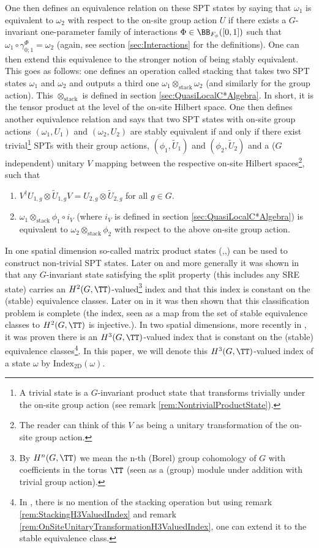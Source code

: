 One then defines an equivalence relation on these SPT states by saying that $\omega_1$ is equivalent to $\omega_2$ with respect to the on-site group action $U$ if there exists a $G$-invariant one-parameter family of interactions $\Phi\in\BB_{F_\phi}([0,1])$ such that $\omega_1\circ\gamma^\Phi_{0;1}=\omega_2$ (again, see section \ref{sec:Interactions} for the definitions). One can then extend this equivalence to the stronger notion of being stably equivalent. This goes as follows: one defines an operation called stacking that takes two SPT states $\omega_1$ and $\omega_2$ and outputs a third one $\omega_1\otimes_{\text{stack}}\omega_2$ (and similarly for the group action). This $\otimes_\text{stack}$ is defined in section \ref{sec:QuasiLocalC*Algebra}. In short, it is the tensor product at the level of the on-site Hilbert space. One then defines another equivalence relation and says that two SPT states with on-site group actions $(\omega_1,U_1)$ and $(\omega_2,U_2)$ are stably equivalent if and only if there exist trivial\footnote{A trivial state is a $G$-invariant product state that transforms trivially under the on-site group action (see remark \ref{rem:NontrivialProductState}).} SPTs with their group actions, $(\phi_1,\tilde{U}_1)$ and $(\phi_2,\tilde{U}_2)$ and a ($G$ independent) unitary $V$ mapping between the respective on-site Hilbert spaces\footnote{The reader can think of this $V$ as being a unitary transformation of the on-site group action.}, such that
\begin{enumerate}
	\item $V^\dagger U_{1,g}\otimes \tilde{U}_{1,g}V=U_{2,g}\otimes \tilde{U}_{2,g}$ for all $g\in G$.
	\item $\omega_1\otimes_{\text{stack}}\phi_1\circ i_V$ (where $i_V$ is defined in section \ref{sec:QuasiLocalC*Algebra}) is equivalent to $\omega_2\otimes_{\text{stack}}\phi_2$ with respect to the above on-site group action.
\end{enumerate}
In one spatial dimension so-called matrix product states (\cite{Chen_2011},\cite{pollmann2012symmetry},\cite{schuch2011MatrixProduct}) can be used to construct non-trivial SPT states. Later on and more generally it was shown in \cite{ogata2021classification} that any $G$-invariant state satisfying the split property (this includes any SRE state) carries an $H^2(G,\TT)$-valued\footnote{By $H^n(G,\TT)$ we mean the n-th (Borel) group cohomology of $G$ with coefficients in the torus $\TT$ (seen as a (group) module under addition with trivial group action).} index and that this index is constant on the (stable) equivalence classes. Later on in \cite{kapustin2021classification} it was then shown that this classification problem is complete (the index, seen as a map from the set of stable equivalence classes to $H^2(G,\TT)$ is injective.). In two spatial dimensions, more recently in \cite{Ogata2d}, it was proven there is an $H^3(G,\TT)$-valued index that is constant on the (stable) equivalence classes\footnote{In \cite{Ogata2d}, there is no mention of the stacking operation but using remark \ref{rem:StackingH3ValuedIndex} and remark \ref{rem:OnSiteUnitaryTransformationH3ValuedIndex}, one can extend it to the stable equivalence class.}. In this paper, we will denote this $H^3(G,\TT)$-valued index of a state $\omega$ by $\textrm{Index}_{\text{2D}}(\omega)$.
